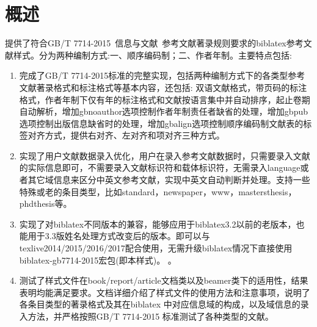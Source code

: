 
\titleandauthor
{}
\tableofcontents
{}
\listofegcode

\section{概述}
提供了符合GB/T 7714-2015~信息与文献~参考文献著录规则要求的biblatex参考文献样式。分为两种编制方式:一、顺序编码制；二、作者年制。主要特点包括:
\begin{enumerate}
  \item 完成了GB/T 7714-2015标准的完整实现，包括两种编制方式下的各类型参考文献著录格式和标注格式等基本内容，还包括: 双语文献格式，带页码的标注格式，作者年制下仅有年的标注格式和文献按语言集中并自动排序，起止卷期自动解析，增加gbnoauthor选项控制作者年制责任者缺省的处理，增加gbpub选项控制出版信息缺省时的处理，增加gbalign选项控制顺序编码制文献表的标签对齐方式，提供右对齐、左对齐和项对齐三种方式。
  \item 实现了用户文献数据录入优化，用户在录入参考文献数据时，只需要录入文献的实际信息即可，不需要录入文献标识符和载体标识符，无需录入language或者其它域信息来区分中英文参考文献，实现中英文自动判断并处理。支持一些特殊或老的条目类型，比如standard，newspaper，www，mastersthesis，phdthesis等。
  \item 实现了对biblatex不同版本的兼容，能够应用于biblatex3.2以前的老版本，也能用于3.3版姓名处理方式改变后的版本。即可以与texlive2014/2015/2016/2017配合使用，无需升级biblatex情况下直接使用biblatex-gb7714-2015宏包(即本样式)。
      。
  \item 测试了样式文件在book/report/article文档类以及beamer类下的适用性，结果表明均能满足要求。文档详细介绍了样式文件的使用方法和注意事项，说明了各条目类型的著录格式及其在biblatex 中对应信息域的构成，以及域信息的录入方法，并严格按照GB/T 7714-2015 标准测试了各种类型的文献。
\end{enumerate}

